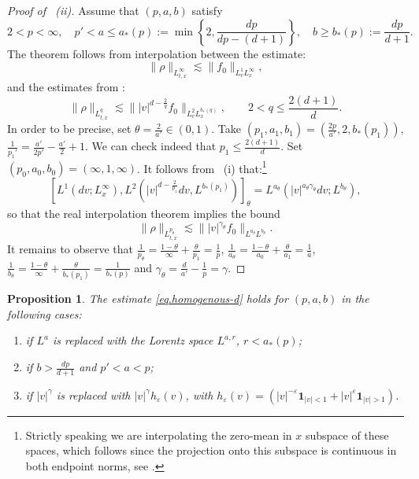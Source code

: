 \documentclass[11pt,a4paper,reqno]{amsart}
\theoremstyle{plain}
\newtheorem{proposition}[theorem]{Proposition}
\theoremstyle{remark}
\begin{document}
\begin{proof}[Proof of ~(ii)] 
Assume that $(p,a,b)$ satisfy
\[
    2<p<\infty, \quad p'<a \leq a_*(p) := \min\left\{2,\frac{dp}{dp-(d+1)}\right\},\quad b\geq b_*(p):=\frac{dp}{d+1}.
\]
The theorem follows from interpolation between the estimate: 
\[
    \|\rho\|_{L^{\infty}_{t,x}} \lesssim \|f_0\|_{L^1_vL^{\infty}_x},
\]
and the estimates from : 
\[
    \|\rho\|_{L^{q}_{t,x}} \lesssim \||v|^{d-\frac{2}{q}}f_0\|_{L^2_vL^{b_*(q)}_x}, \qquad 2 < q \leq \frac{2(d+1)}{d}.
\]
In order to be precise, set $\theta = \frac{2}{a'} \in (0,1)$. Take $(p_1,a_1,b_1)=(\frac{2p}{a'},2,b_*(p_1))$,  $\frac{1}{p_1'}=\frac{a'}{2p'}-\frac{a'}{2}+1$. We can check indeed that $p_1 \leq \frac{2(d+1)}{d}$.
Set $(p_0,a_0,b_0)=(\infty,1,\infty)$. It follows from ~(i) that:\footnote{Strictly speaking we are interpolating the zero-mean in $x$ subspace of these spaces, which follows since the projection onto this subspace is continuous in both endpoint norms, see \cite[Theorem 1.17.1.1]{Triebel1978}.}
\[
    \left[L^1(dv;L^{\infty}_x),L^2\left(|v|^{d-\frac{2}{p_1}}dv,L^{b_*(p_1)}\right)\right]_{\theta} = L^{a_{\theta}}(|v|^{a_{\theta}\gamma_{\theta}}dv;L^{b_{\theta}}), 
\]
so that the real interpolation theorem implies the bound 
\[
    \|\rho\|_{L^{p_{\theta}}_{t,x}} \lesssim \||v|^{\gamma_{\theta}} f_0\|_{L^{a_{\theta}}L^{b_{\theta}}}.
\]
It remains to observe that $\frac{1}{p_{\theta}} = \frac{1-\theta}{\infty} + \frac{\theta}{p_1} = \frac{1}{p}$, $\frac{1}{a_{\theta}} = \frac{1-\theta}{a_0} + \frac{\theta}{a_1} = \frac{1}{a}$, $\frac{1}{b_{\theta}} = \frac{1-\theta}{\infty} + \frac{\theta}{b_*(p_1)} = \frac{1}{b_*(p)}$ and $\gamma_{\theta}=\frac{d}{a'}-\frac{1}{p}=\gamma$.
\end{proof}

\begin{proposition}\label{prop.substitute}
The estimate \eqref{eq.homogenous-d} holds for $(p,a,b)$ in the following cases:
\begin{enumerate}[label=(\roman*)]
    \item if $L^{a}$ is replaced with the Lorentz space $L^{a,r}$, $r<a_*(p)$;
    \item if $b>\frac{dp}{d+1}$ and $p'<a<p$;
    \item if $|v|^{\gamma}$ is replaced with $|v|^{\gamma}h_{\varepsilon}(v)$, with $h_{\varepsilon}(v)=(|v|^{-\varepsilon}\mathbf{1}_{|v|<1} + |v|^{\varepsilon}\mathbf{1}_{|v|>1})$. 
\end{enumerate}
\end{proposition}
\end{document}
